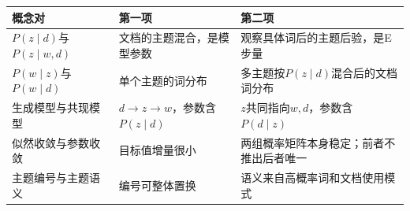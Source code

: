 \begin{comparisonbox}
\begin{tabularx}{\linewidth}{@{}l X X@{}}
\toprule 概念对 & 第一项 & 第二项\\ \midrule
$P(z\mid d)$与$P(z\mid w,d)$ & 文档的主题混合，是模型参数 & 观察具体词后的主题后验，是E步量\\
$P(w\mid z)$与$P(w\mid d)$ & 单个主题的词分布 & 多主题按$P(z\mid d)$混合后的文档词分布\\
生成模型与共现模型 & $d\to z\to w$，参数含$P(z\mid d)$ & $z$共同指向$w,d$，参数含$P(d\mid z)$\\
似然收敛与参数收敛 & 目标值增量很小 & 两组概率矩阵本身稳定；前者不推出后者唯一\\
主题编号与主题语义 & 编号可整体置换 & 语义来自高概率词和文档使用模式\\
\bottomrule
\end{tabularx}
\end{comparisonbox}

